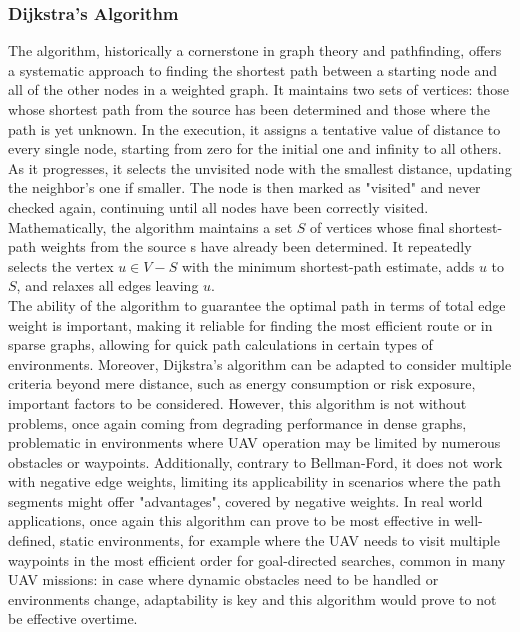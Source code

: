 \documentclass[conference]{IEEEtran}
\begin{document}
\subsubsection{Dijkstra's Algorithm}

The algorithm, historically a cornerstone \cite{dijkstra} in graph theory and pathfinding, offers a systematic approach to finding the shortest path between a starting node and all of the other nodes in a weighted graph. It maintains two sets of vertices: those whose shortest path from the source has been determined and those where the path is yet unknown. In the execution, it assigns a tentative value of distance to every single node, starting from zero for the initial one and infinity to all others. As it progresses, it selects the unvisited node with the smallest distance, updating the neighbor's one if smaller. The node is then marked as "visited" and never checked again, continuing until all nodes have been correctly visited. Mathematically, the algorithm maintains a set $S$ of vertices whose final shortest-path weights from the source s have already been determined. It repeatedly selects the vertex $u \in V - S$ with the minimum shortest-path estimate, adds $u$ to $S$, and relaxes all edges leaving $u$. \\

The ability of the algorithm to guarantee the optimal path in terms of total edge weight is important, making it reliable for finding the most efficient route or in sparse graphs, allowing for quick path calculations in certain types of environments. Moreover, Dijkstra's algorithm can be adapted to consider multiple criteria beyond mere distance, such as energy consumption or risk exposure, important factors to be considered. However, this algorithm is not without problems, once again coming from degrading performance in dense graphs, problematic in environments where UAV operation may be limited by numerous obstacles or waypoints. Additionally, contrary to Bellman-Ford, it does not work with negative edge weights, limiting its applicability in scenarios where the path segments might offer "advantages", covered by negative weights. In real world applications, once again this algorithm can prove to be most effective in well-defined, static environments, for example where the UAV needs to visit multiple waypoints in the most efficient order for goal-directed searches, common in many UAV missions: in case where dynamic obstacles need to be handled or environments change, adaptability is key and this algorithm would prove to not be effective overtime.\\
\end{document}
